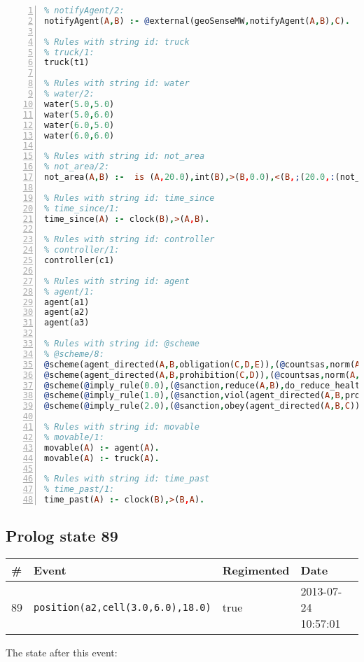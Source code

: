 \documentclass[11pt]{article}\usepackage[utf8]{inputenc}\usepackage{geometry}
\begin{document}
\begin{lstlisting}[language=Prolog, numbers=left]
% Rules with string id: notifyAgent
% notifyAgent/2:
notifyAgent(A,B) :- @external(geoSenseMW,notifyAgent(A,B),C).

% Rules with string id: truck
% truck/1:
truck(t1)

% Rules with string id: water
% water/2:
water(5.0,5.0)
water(5.0,6.0)
water(6.0,5.0)
water(6.0,6.0)

% Rules with string id: not_area
% not_area/2:
not_area(A,B) :-  is (A,20.0),int(B),>(B,0.0),<(B,;(20.0,:(not_area(A,B), is (-(B),20.0)))),int(A),>(A,0.0),<(A,;(20.0,:(area(A,B),-(int(A))))),int(B),>(A,0.0),>(B,0.0),<(A,21.0),<(B,21.0).

% Rules with string id: time_since
% time_since/1:
time_since(A) :- clock(B),>(A,B).

% Rules with string id: controller
% controller/1:
controller(c1)

% Rules with string id: agent
% agent/1:
agent(a1)
agent(a2)
agent(a3)

% Rules with string id: @scheme
% @scheme/8:
@scheme(agent_directed(A,B,obligation(C,D,E)),(@countsas,norm(A,B,F,obligation(C,D,E)),F),false,(listTrue(C)),(time_past(D)),false,[plus(viol(agent_directed(A,B,obligation(C,D,E))))|[]],[plus(obey(agent_directed(A,B,obligation(C,D,E))))|[]])
@scheme(agent_directed(A,B,prohibition(C,D)),(@countsas,norm(A,B,E,prohibition(C,D)),E),(listTrue(C)),false,(false),false,[plus(viol(agent_directed(A,B,prohibition(C,D))))|[]],[plus(obey(agent_directed(A,B,prohibition(C,D))))|[]])
@scheme(@imply_rule(0.0),(@sanction,reduce(A,B),do_reduce_health(A,B),notifyAgent(A,changed(status))),true,false,false,false,[min(reduce(A,B))|[]],[])
@scheme(@imply_rule(1.0),(@sanction,viol(agent_directed(A,B,prohibition(C,D))),do_sanction(D)),true,false,false,false,[min(viol(agent_directed(A,B,prohibition(C,D))))|[]],[])
@scheme(@imply_rule(2.0),(@sanction,obey(agent_directed(A,B,C))),true,false,false,false,[min(obey(agent_directed(A,B,C)))|[]],[])

% Rules with string id: movable
% movable/1:
movable(A) :- agent(A).
movable(A) :- truck(A).

% Rules with string id: time_past
% time_past/1:
time_past(A) :- clock(B),>(B,A).

\end{lstlisting}
\clearpage 
\subsection{Prolog state 89}
\begin{table}[ht]
\centering 
\begin{tabular}{l l l l} 
\textbf{\#} & \textbf{Event} & \textbf{Regimented} & \textbf{Date} \\ [0.5ex] 
\hline
89&\texttt{position(a2,cell(3.0,6.0),18.0)}&true&2013-07-24 10:57:01\\ [1ex] \hline\end{tabular}
\end{table}
The state after this event:
\end{document}
